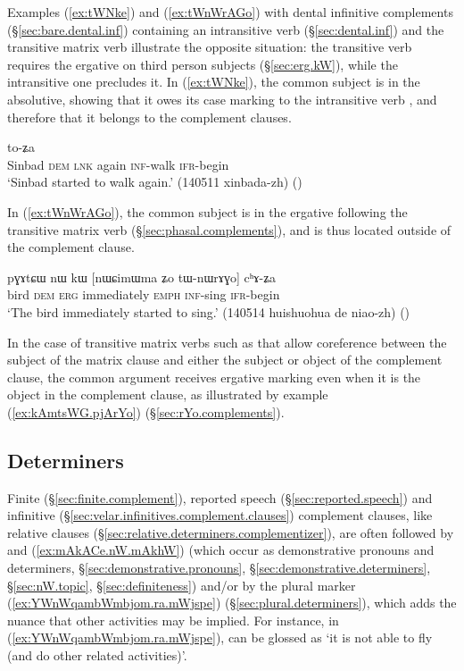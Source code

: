 Examples (\ref{ex:tWNke}) and (\ref{ex:tWnWrAGo}) with dental infinitive complements (§\ref{sec:bare.dental.inf}) containing an intransitive verb (§\ref{sec:dental.inf}) and the transitive matrix verb  illustrate the opposite situation: the transitive verb requires the ergative on third person subjects (§\ref{sec:erg.kW}), while the intransitive one precludes it. In (\ref{ex:tWNke}), the common subject is in the absolutive, showing that it owes its case marking to the intransitive verb , and therefore that it belongs to the complement clauses.

\begin{exe}
\ex \label{ex:tWNke}
 to-ʑa \\
Sinbad \textsc{dem} \textsc{lnk} again  \textsc{inf}-walk \textsc{ifr}-begin \\
\glt `Sinbad started to walk again.' (140511 xinbada-zh)
()
\end{exe}

In (\ref{ex:tWnWrAGo}), the common subject is in the ergative following the transitive matrix verb  (§\ref{sec:phasal.complements}), and is thus located outside of the complement clause.

\begin{exe}
\ex \label{ex:tWnWrAGo}
\gll pɣɤtɕɯ nɯ kɯ [nɯɕimɯma ʑo tɯ-nɯrɤɣo] cʰɤ-ʑa \\
bird \textsc{dem} \textsc{erg} immediately \textsc{emph} \textsc{inf}-sing \textsc{ifr}-begin \\
\glt `The bird immediately started to sing.' (140514 huishuohua de niao-zh)
()
\end{exe}

In the case of transitive matrix verbs such as  that allow coreference between the subject of the matrix clause and either the subject or object of the complement clause, the common argument receives ergative marking even when it is the object in the complement clause, as illustrated by example (\ref{ex:kAmtsWG.pjArYo}) (§\ref{sec:rYo.complements}).

\subsection{Determiners} \label{sec:complement.determiner}
Finite (§\ref{sec:finite.complement}), reported speech (§\ref{sec:reported.speech}) and infinitive (§\ref{sec:velar.infinitives.complement.clauses}) complement clauses, like relative clauses (§\ref{sec:relative.determiners.complementizer}), are often followed by  and  (\ref{ex:mAkACe.nW.mAkhW})  (which occur as  demonstrative pronouns and determiners, §\ref{sec:demonstrative.pronouns}, §\ref{sec:demonstrative.determiners}, §\ref{sec:nW.topic}, §\ref{sec:definiteness}) and/or by the plural marker  (\ref{ex:YWnWqambWmbjom.ra.mWjspe}) (§\ref{sec:plural.determiners}), which adds the nuance that other activities may be implied. For instance, in (\ref{ex:YWnWqambWmbjom.ra.mWjspe}),  can be glossed as `it is not able to fly (and do other related activities)'.

